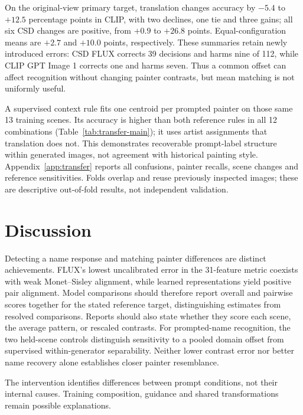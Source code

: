 

On the original-view primary target, translation changes accuracy by $-5.4$
to $+12.5$ percentage points in CLIP,
with two declines, one tie and three gains; all six CSD changes are positive,
from $+0.9$ to $+26.8$ points. Equal-configuration means are $+2.7$ and $+10.0$
points, respectively. These summaries retain newly introduced errors:
CSD FLUX corrects 39 decisions and harms nine of 112, while CLIP GPT Image 1
corrects one and harms seven. Thus a common offset can affect recognition
without changing painter contrasts, but mean matching is not uniformly useful.

A supervised context rule fits one centroid per prompted painter on those same
13 training scenes. Its accuracy is higher than both reference rules in all 12
combinations (Table~\ref{tab:transfer-main}); it uses artist assignments that
translation does not. This demonstrates recoverable prompt-label structure
within generated images, not agreement with historical painting style.
Appendix~\ref{app:transfer} reports all confusions, painter recalls, scene changes
and reference sensitivities. Folds overlap and reuse previously inspected
images; these are descriptive out-of-fold results, not independent validation.

\section{Discussion}\label{sec:discussion}
Detecting a name response and matching painter differences are distinct achievements.
FLUX's lowest uncalibrated error in the 31-feature metric coexists with weak
Monet--Sisley alignment, while learned representations yield positive pair alignment.
Model comparisons should therefore report overall and pairwise scores together
for the stated reference target, distinguishing estimates from resolved comparisons.
Reports should also state whether they score each scene, the average pattern,
or rescaled contrasts. For prompted-name recognition, the two held-scene
controls distinguish sensitivity to a pooled domain offset from supervised
within-generator separability. Neither lower contrast error nor better name
recovery alone establishes closer painter resemblance.

The intervention identifies differences between prompt conditions, not their
internal causes. Training composition, guidance and shared transformations remain
possible explanations.

